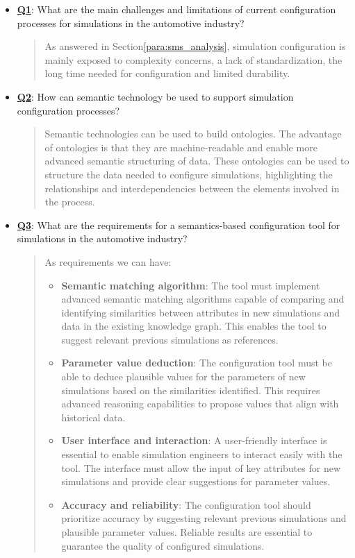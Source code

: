 \begin{itemize}
    \item \hyperref[Q1]{\textbf{Q1}}: What are the main challenges and limitations of current configuration processes for simulations in the automotive industry?
    \begin{quote}
        As answered in Section\ref{para:sms_analysis}, simulation configuration is mainly exposed to complexity concerns, a lack of standardization, the long time needed for configuration and limited durability.\\
    \end{quote}

    \item \hyperref[Q2]{\textbf{Q2}}: How can semantic technology be used to support simulation configuration processes?
    \begin{quote}
        Semantic technologies can be used to build ontologies. The advantage of ontologies is that they are machine-readable and enable more advanced semantic structuring of data. These ontologies can be used to structure the data needed to configure simulations, highlighting the relationships and interdependencies between the elements involved in the process.\\
    \end{quote}
    
    \item \hyperref[Q3]{\textbf{Q3}}: What are the requirements for a semantics-based configuration tool for simulations in the automotive industry?
    \begin{quote}
        As requirements we can have:
        \begin{itemize}
            \item \textbf{Semantic matching algorithm}: The tool must implement advanced semantic matching algorithms capable of comparing and identifying similarities between attributes in new simulations and data in the existing knowledge graph. This enables the tool to suggest relevant previous simulations as references.
            \item \textbf{Parameter value deduction}: The configuration tool must be able to deduce plausible values for the parameters of new simulations based on the similarities identified. This requires advanced reasoning capabilities to propose values that align with historical data.
            \item \textbf{User interface and interaction}: A user-friendly interface is essential to enable simulation engineers to interact easily with the tool. The interface must allow the input of key attributes for new simulations and provide clear suggestions for parameter values.
            \item \textbf{Accuracy and reliability}: The configuration tool should prioritize accuracy by suggesting relevant previous simulations and plausible parameter values. Reliable results are essential to guarantee the quality of configured simulations.\\
        \end{itemize}
    \end{quote}
    

\end{itemize}
